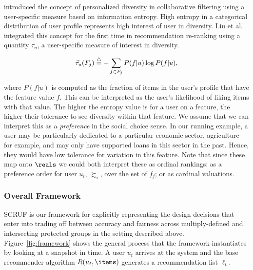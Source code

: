 \cite{eskan2017-personalized-diversity} introduced the concept of personalized diversity in collaborative filtering using a user-specific measure based on information entropy. High entropy in a categorical distribution of user profile represents high interest of user in diversity. Liu et al. \cite{liu2018personalizing,liu2019personalized} integrated this concept for the first time in recommendation re-ranking using a quantity $\tau_u$, a user-specific measure of interest in diversity.

\begin{equation}
\vec{\tau}_u(F_{j})\buildrel\triangle\over=-\sum_{f \in F_j} P(f|u)\log P(f|u),
\label{eq:tau}
\end{equation}

\noindent where $P(f|u)$ is computed as the fraction of items in the user's profile that have the feature value $f$. This can be interpreted as the user's likelihood of liking items with that value. The higher the entropy value is for a user on a feature, the higher their tolerance to see diversity within that feature. We assume that we can interpret this as a \emph{preference} in the social choice sense. In our running example, a user may be particularly dedicated to a particular economic sector, agriculture for example, and may only have supported loans in this sector in the past.  Hence, they would have low tolerance for variation in this feature. Note that since these map onto $\reals$ we could both interpret these as ordinal rankings: as a preference order for user $u_i$, $\succsim_i$, over the set of $f_j$; or as cardinal valuations.

\subsubsection{Overall Framework}
SCRUF is our framework for explicitly representing the design decisions that enter into trading off between accuracy and fairness across multiply-defined and intersecting protected groups in the setting described above. Figure~\ref{fig:framework} shows the general process that the framework instantiates by looking at a snapshot in time. A user $u_t$ arrives at the system and the base recommender algorithm $R(u_t,\items)$ generates a recommendation list $\ell_t$. 

